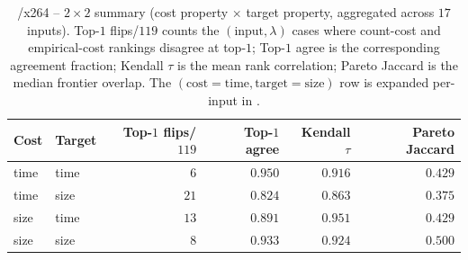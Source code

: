 \begin{table}[t]
\centering
\caption{\StudyReplication/x264 -- $2\times 2$ summary (cost property
$\times$ target property, aggregated across $17$ inputs).
Top-$1$ flips/$119$ counts the $(\text{input},\lambda)$ cases where
count-cost and empirical-cost rankings disagree at top-$1$;
Top-$1$ agree is the corresponding agreement fraction;
Kendall $\tau$ is the mean rank correlation;
Pareto Jaccard is the median frontier overlap. The
$(\text{cost}=\text{time}, \text{target}=\text{size})$ row is expanded
per-input in .}
\label{tab:x264-matrix-summary}
\footnotesize
\setlength{\tabcolsep}{4.5pt}
\begin{tabular}{l l r r r r}
\toprule
Cost & Target & Top-$1$ flips/$119$ & Top-$1$ agree & Kendall $\tau$ & Pareto Jaccard \\
\midrule
time & time   & $6$  & $0.950$ & $0.916$ & $0.429$ \\
time & size   & $21$ & $0.824$ & $0.863$ & $0.375$ \\
size & time   & $13$ & $0.891$ & $0.951$ & $0.429$ \\
size & size   & $8$  & $0.933$ & $0.924$ & $0.500$ \\
\bottomrule
\end{tabular}
\end{table}

